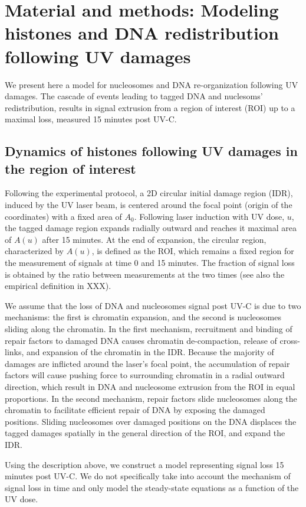 \documentclass[12pt]{article}
\begin{document}
\section{Material and methods: Modeling  histones and DNA redistribution following UV damages}
We present here a model for nucleosomes and DNA re-organization following UV damages. The cascade of events leading to tagged DNA and nuclesoms'  redistribution, results in signal extrusion from a region of interest (ROI) up to a maximal loss, measured 15 minutes post UV-C. 

\subsection{Dynamics of histones following UV damages in the region of interest}

Following the experimental protocol, a 2D circular initial damage region (IDR), induced by the UV laser beam, is centered around the focal point (origin of the coordinates) with a fixed area of $A_0$. Following laser induction with UV dose, $u$, the tagged damage region expands radially outward and reaches it maximal area of $A(u)$ after 15 minutes. At the end of expansion, the circular region, characterized by $A(u)$, is defined as the ROI, which remains a fixed region for the measurement of signals at time 0 and 15 minutes. The fraction of signal loss is obtained by the ratio between measurements at the two times (see also the empirical definition in XXX). 

We assume that the loss of DNA and nucleosomes signal post UV-C is due to two mechanisms: the first is chromatin expansion, and the second is nucleosomes sliding along the chromatin. In the first mechanism, recruitment and binding of repair factors to damaged DNA causes chromatin de-compaction, release of cross-links, and expansion of the chromatin in the IDR. Because the majority of damages are inflicted around the laser's focal point, the accumulation of repair factors will cause pushing force to surrounding chromatin in a radial outward direction, which result in DNA and nucleosome extrusion from the ROI in equal proportions. In the second mechanism, repair factors slide nucleosomes along the chromatin to facilitate efficient repair of DNA by exposing the damaged positions. 
Sliding nucleosomes over damaged positions on the DNA displaces the tagged damages spatially in the general direction of the ROI, and expand the IDR. 
 
Using the description above, we construct a model representing signal loss 15 minutes post UV-C. We do not specifically take into account the mechanism of signal loss in time and only model the steady-state equations as a function of the UV dose.
\end{document}
